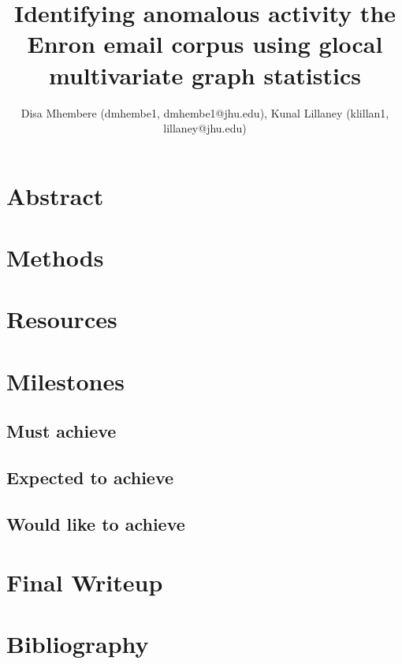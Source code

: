 \documentclass[11pt]{article}
\title{Identifying anomalous activity the Enron email corpus using glocal multivariate graph statistics}
\author{Disa Mhembere (dmhembe1, dmhembe1@jhu.edu), Kunal Lillaney (klillan1, lillaney@jhu.edu)}
\date{}
\begin{document}
\maketitle

\section{Abstract}

\section{Methods}

\section{Resources}

\section{Milestones}
\subsection{Must achieve}

\subsection{Expected to achieve}

\subsection{Would like to achieve}


\section{Final Writeup}

\section{Bibliography}
\end{document}
